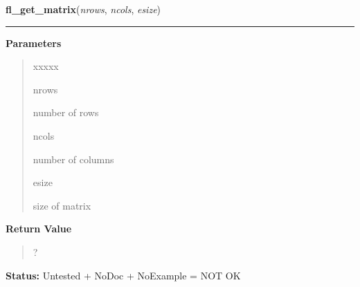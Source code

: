     \label{xformslib:library:fl_get_matrix}

    \vspace{0.5ex}

\hspace{.8\funcindent}\begin{boxedminipage}{\funcwidth}

    \raggedright \textbf{fl\_get\_matrix}(\textit{nrows}, \textit{ncols}, \textit{esize})

    \vspace{-1.5ex}

    \rule{\textwidth}{0.5\fboxrule}
\setlength{\parskip}{2ex}
\setlength{\parskip}{1ex}
      \textbf{Parameters}
      \vspace{-1ex}

      \begin{quote}
        \begin{Ventry}{xxxxx}

          \item[nrows]

          number of rows

          \item[ncols]

          number of columns

          \item[esize]

          size of matrix

        \end{Ventry}

      \end{quote}

      \textbf{Return Value}
    \vspace{-1ex}

      \begin{quote}
      ?

      \end{quote}

\textbf{Status:} Untested + NoDoc + NoExample = NOT OK



    \end{boxedminipage}

    \label{xformslib:library:fl_make_matrix}

